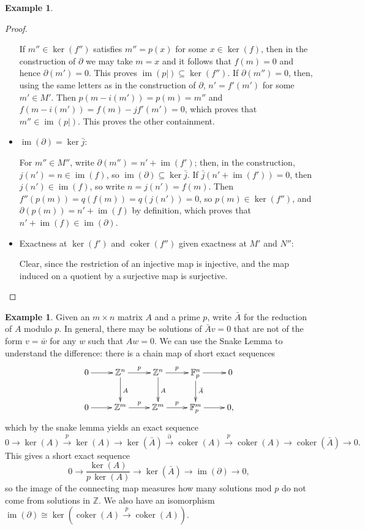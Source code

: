 \documentclass{amsart}[12pt]
\def\image{\operatorname{im}}
\def\im{\image}
\def\ker{\operatorname{ker}}
\def\coker{\operatorname{coker}}
\newcommand{\F}{\mathbb{F}}
\newcommand{\Z}{\mathbb{Z}}
\numberwithin{equation}{section}
\theoremstyle{plain} %
\theoremstyle{definition}
\newtheorem{ex}[equation]{Example}
\theoremstyle{remark}
\newcommand{\xra}[1]{\xrightarrow{#1}}
\begin{document}
\begin{ex}
\begin{proof}
\begin{itemize}
If $m'' \in \ker(f'')$ satisfies $m'' = p(x)$ for some $x \in \ker(f)$, then in the construction of $\partial$ we may take $m = x$ and it follows
that $f(m) = 0$ and hence $\partial(m') = 0$. This proves $\im(p|) \subseteq \ker(f'')$.
If $\partial(m'')  = 0$, then, using the same letters as in the construction of $\partial$, $n' = f'(m')$ for some $m'\in M'$. Then
$p(m - i(m')) = p(m) = m''$ and $f(m - i(m')) = f(m) - jf'(m') = 0$, which proves that $m'' \in \im(p|)$. This proves the other containment.

\item $\im(\partial)=\ker\bar{j}$: 

For $m''\in M''$, write $\partial(m'')=n'+\im(f')$; then, in the construction, $j(n')=n\in \im(f)$, so $\im(\partial)\subseteq \ker\bar{j}$. If $\bar{j}(n' + \im(f') )=0$, then $j(n')\in \im(f)$, so write $n=j(n') = f(m)$. Then $f''(p(m))=q(f(m))=q(j(n'))=0$, so $p(m)\in \ker(f'')$, and $\partial(p(m))=n'+\im(f)$ by definition, which proves that $n'+\im(f)\in \im(\partial)$.

\item Exactness at $\ker(f')$ and $\coker(f'')$ given exactness at $M'$ and $N''$:

Clear, since the restriction of an injective map is injective, and the map induced on a quotient by a surjective map is surjective.\qedhere
\end{itemize}
\end{proof}

\begin{ex} Given an $m\times n$ matrix $A$ and a prime $p$, write $\bar{A}$ for the reduction of $A$ modulo $p$. In general, there may be solutions of $\bar{A}v=0$ that are not of the form $v=\bar{w}$ for any $w$ such that $Aw=0$. We can use the Snake Lemma to understand the difference: there is a chain map of short exact sequences
\[ \xymatrix{ 0\ar[r] & \Z^n \ar[r]^{p}\ar[d]^A & \Z^n \ar[r]^{p}\ar[d]^A & \F^n_p \ar[r]\ar[d]^{\bar{A}} & 0 \\
0\ar[r] & \Z^m \ar[r]^{p} & \Z^m \ar[r]^{p} & \F^m_p \ar[r] & 0,}\]
which by the snake lemma yields an exact sequence
\[ 0 \to \ker(A) \xra{p} \ker(A) \to \ker(\bar{A}) \xra{\partial} \coker(A) \xra{p} \coker(A) \to \coker(\bar{A}) \to 0.\]
This gives a short exact sequence
\[ 0 \to \frac{\ker(A)}{p \, \ker(A)} \to \ker(\bar{A}) \to \im(\partial) \to 0,\]
so the image of the connecting map measures how many solutions mod $p$ do not come from solutions in $\Z$. We also have an isomorphism $\im(\partial) \cong \ker( \coker(A) \xra{p} \coker(A))$.


\end{ex}
\end{ex}
\end{document}
